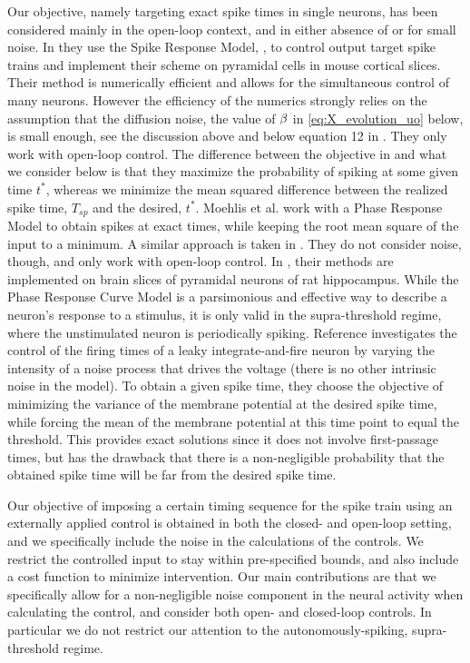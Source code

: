 \documentclass[12pt]{iopart}
\begin{document}
Our objective, namely targeting exact spike times in single neurons, has been
considered mainly in the open-loop context, and in either absence of or for
small noise. In \cite{Ahmadian2011} they use the Spike Response Model,
\cite{Gerstner2002}, to control output target spike trains and implement their
scheme on pyramidal cells in mouse cortical slices. Their method is numerically
efficient and allows for the simultaneous control of many neurons. However the
efficiency of the numerics strongly relies on the assumption that the diffusion
noise, the value of ${\beta}$ in \cref{eq:X_evolution_uo} below, is small enough, see
the discussion above and below equation 12 in \cite{Ahmadian2011}. They only
work with open-loop control. The difference between the objective in
\cite{Ahmadian2011} and what we consider below is that they maximize the
probability of spiking at some given time $t^*$, whereas we minimize the mean squared
difference between the realized spike time, $T_{sp}$ and the desired, $t^*$.
Moehlis et al. \cite{Moehlis2006} work with a Phase Response Model to obtain
spikes at exact times, while keeping the root mean square of the input to a
minimum. A similar approach is taken in \cite{Dasanayake2011}. They do not
consider noise, though, and only work with open-loop control. In
\cite{Nabi2013}, their methods are implemented on brain slices of pyramidal
neurons of rat hippocampus. While the
Phase Response Curve Model is a parsimonious and effective way to describe a
neuron's response to a stimulus, it is only valid in the supra-threshold regime,
where the unstimulated neuron is periodically spiking. Reference
\cite{Feng2003} investigates the control of the firing times of a
leaky integrate-and-fire neuron by varying the intensity of a noise process that
drives the voltage (there is no other intrinsic noise in the model). 
To obtain a given spike time, they choose the objective of minimizing the
variance of the membrane potential at the desired spike time, while forcing the
mean of the membrane potential at this time point to equal the threshold. This
provides exact solutions since it does not involve first-passage times, but has
the drawback that there is a non-negligible probability that the obtained spike
time will be far from the desired spike time.

Our objective of imposing a certain timing sequence for the spike train using an
externally applied control is obtained in both the closed- and
open-loop setting, and we specifically include the noise in the
calculations of the controls. We restrict the controlled input to stay
within pre-specified bounds, and also include a cost function to
minimize intervention.
Our main contributions are that we specifically allow for a non-negligible
noise component in the neural activity when calculating the control, and
consider both open- and closed-loop controls. In particular we do not
restrict our attention to the autonomously-spiking, supra-threshold regime. 
\end{document}
